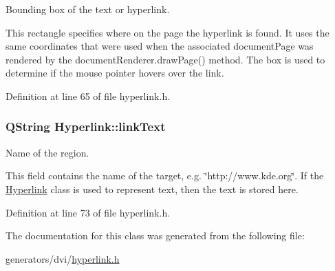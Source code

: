 Bounding box of the text or hyperlink. 

This rectangle specifies where on the page the hyperlink is found. It uses the same coordinates that were used when the associated document\+Page was rendered by the document\+Renderer.\+draw\+Page() method. The box is used to determine if the mouse pointer hovers over the link. 

Definition at line 65 of file hyperlink.\+h.

\hypertarget{classHyperlink_a9aa732893dfb8f1c253132dca07cb052}{
\subsubsection[{link\+Text}]{\setlength{\rightskip}{0pt plus 5cm}Q\+String Hyperlink\+::link\+Text}}\label{classHyperlink_a9aa732893dfb8f1c253132dca07cb052}


Name of the region. 

This field contains the name of the target, e.\+g. \char`\"{}http\+://www.\+kde.\+org\char`\"{}. If the \hyperlink{classHyperlink}{Hyperlink} class is used to represent text, then the text is stored here. 

Definition at line 73 of file hyperlink.\+h.



The documentation for this class was generated from the following file\+:\begin{DoxyCompactItemize}
\item 
generators/dvi/\hyperlink{hyperlink_8h}{hyperlink.\+h}\end{DoxyCompactItemize}
